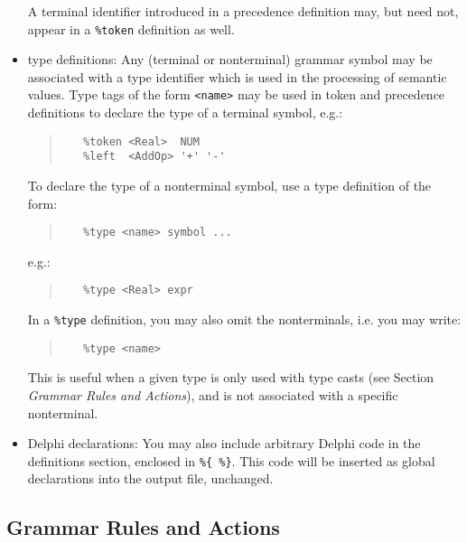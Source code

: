 \documentclass[a4paper]{article}
\begin{document}
\begin{itemize}
      A terminal identifier introduced in a precedence definition may, but
      need not, appear in a \verb"%token" definition as well.
   \item
      type definitions: Any (terminal or nonterminal) grammar symbol may be
      associated with a type identifier which is used in the processing of
      semantic values. Type tags of the form \verb"<name>" may be used in
      token and precedence definitions to declare the type of a terminal
      symbol, e.g.:
      \begin{quote}\begin{verbatim}
   %token <Real>  NUM
   %left  <AddOp> '+' '-'
      \end{verbatim}\end{quote}

      To declare the type of a nonterminal symbol, use a type definition of
      the form:
      \begin{quote}\begin{verbatim}
   %type <name> symbol ...
      \end{verbatim}\end{quote}
      e.g.:
      \begin{quote}\begin{verbatim}
   %type <Real> expr
      \end{verbatim}\end{quote}

      In a \verb"%type" definition, you may also omit the nonterminals, i.e.
      you may write:
      \begin{quote}\begin{verbatim}
   %type <name>
      \end{verbatim}\end{quote}

      This is useful when a given type is only used with type casts (see
      Section {\em Grammar Rules and Actions\/}), and is not associated with
      a specific nonterminal.
   \item
      Delphi declarations: You may also include arbitrary Delphi
      code in the definitions section, enclosed in \verb"%{ %}". This code
      will be inserted as global declarations into the output file, unchanged.
\end{itemize}

\subsection{Grammar Rules and Actions}
\end{document}
